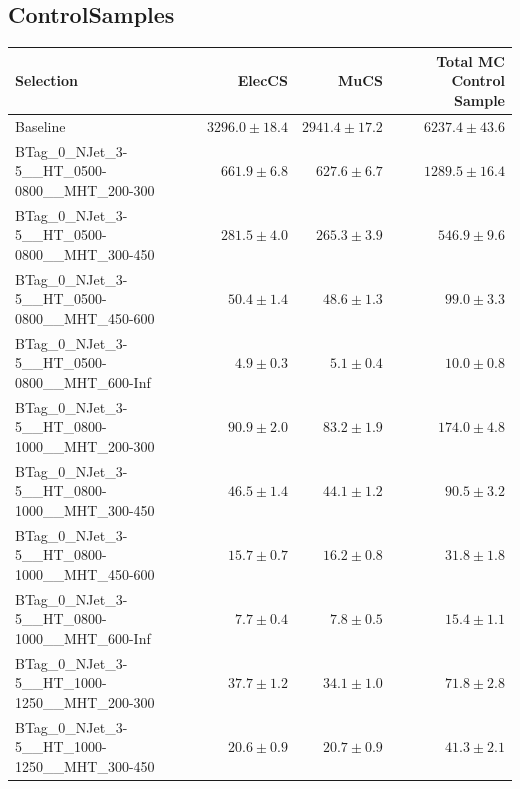 \documentclass{beamer}
\begin{document}
\subsection{ControlSamples}
\begin{frame}
\tiny
\begin{tabular}{lrrr}
\toprule

                                                Selection  &                   ElecCS  &                     MuCS  &          Total MC Control Sample  \\ 
\midrule
                                             Baseline &           $3296.0\pm18.4$&           $2941.4\pm17.2$&               $6237.4\pm43.6$ \\ 
      BTag\_0\_NJet\_3-5\_\_HT\_0500-0800\_\_MHT\_200-300 &             $661.9\pm6.8$&             $627.6\pm6.7$&               $1289.5\pm16.4$ \\ 
      BTag\_0\_NJet\_3-5\_\_HT\_0500-0800\_\_MHT\_300-450 &             $281.5\pm4.0$&             $265.3\pm3.9$&                 $546.9\pm9.6$ \\ 
      BTag\_0\_NJet\_3-5\_\_HT\_0500-0800\_\_MHT\_450-600 &              $50.4\pm1.4$&              $48.6\pm1.3$&                  $99.0\pm3.3$ \\ 
      BTag\_0\_NJet\_3-5\_\_HT\_0500-0800\_\_MHT\_600-Inf &               $4.9\pm0.3$&               $5.1\pm0.4$&                  $10.0\pm0.8$ \\ 
      BTag\_0\_NJet\_3-5\_\_HT\_0800-1000\_\_MHT\_200-300 &              $90.9\pm2.0$&              $83.2\pm1.9$&                 $174.0\pm4.8$ \\ 
      BTag\_0\_NJet\_3-5\_\_HT\_0800-1000\_\_MHT\_300-450 &              $46.5\pm1.4$&              $44.1\pm1.2$&                  $90.5\pm3.2$ \\ 
      BTag\_0\_NJet\_3-5\_\_HT\_0800-1000\_\_MHT\_450-600 &              $15.7\pm0.7$&              $16.2\pm0.8$&                  $31.8\pm1.8$ \\ 
      BTag\_0\_NJet\_3-5\_\_HT\_0800-1000\_\_MHT\_600-Inf &               $7.7\pm0.4$&               $7.8\pm0.5$&                  $15.4\pm1.1$ \\ 
      BTag\_0\_NJet\_3-5\_\_HT\_1000-1250\_\_MHT\_200-300 &              $37.7\pm1.2$&              $34.1\pm1.0$&                  $71.8\pm2.8$ \\ 
      BTag\_0\_NJet\_3-5\_\_HT\_1000-1250\_\_MHT\_300-450 &              $20.6\pm0.9$&              $20.7\pm0.9$&                  $41.3\pm2.1$ \\ 

\end{tabular}
\end{frame}
\end{document}
